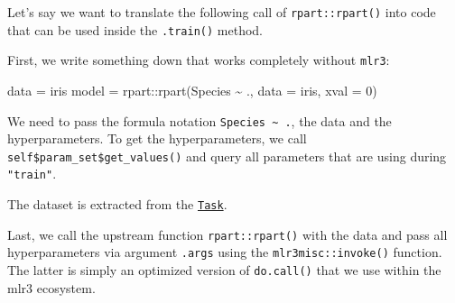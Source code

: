 \documentclass[
]{scrbook}
\newenvironment{Shaded}{\begin{snugshade}}{\end{snugshade}}
\newcommand{\AttributeTok}[1]{\textcolor[rgb]{0.77,0.63,0.00}{#1}}
\newcommand{\ControlFlowTok}[1]{\textcolor[rgb]{0.13,0.29,0.53}{\textbf{#1}}}
\newcommand{\DecValTok}[1]{\textcolor[rgb]{0.00,0.00,0.81}{#1}}
\newcommand{\FunctionTok}[1]{\textcolor[rgb]{0.00,0.00,0.00}{#1}}
\newcommand{\NormalTok}[1]{#1}
\newcommand{\OtherTok}[1]{\textcolor[rgb]{0.56,0.35,0.01}{#1}}
\newcommand{\SpecialCharTok}[1]{\textcolor[rgb]{0.00,0.00,0.00}{#1}}
\newcommand{\StringTok}[1]{\textcolor[rgb]{0.31,0.60,0.02}{#1}}
\renewenvironment{Shaded} {\begin{snugshade}\small} {\end{snugshade}}
\begin{document}
Let's say we want to translate the following call of \texttt{rpart::rpart()} into code that can be used inside the \texttt{.train()} method.

First, we write something down that works completely without \texttt{mlr3}:

\begin{Shaded}
\begin{Highlighting}[]
\NormalTok{data }\OtherTok{=}\NormalTok{ iris}
\NormalTok{model }\OtherTok{=}\NormalTok{ rpart}\SpecialCharTok{::}\FunctionTok{rpart}\NormalTok{(Species }\SpecialCharTok{\textasciitilde{}}\NormalTok{ ., }\AttributeTok{data =}\NormalTok{ iris, }\AttributeTok{xval =} \DecValTok{0}\NormalTok{)}
\end{Highlighting}
\end{Shaded}

We need to pass the formula notation \texttt{Species\ \textasciitilde{}\ .}, the data and the hyperparameters.
To get the hyperparameters, we call \texttt{self\$param\_set\$get\_values()} and query all parameters that are using during \texttt{"train"}.

The dataset is extracted from the \href{https://mlr3.mlr-org.com/reference/Task.html}{\texttt{Task}}.

Last, we call the upstream function \texttt{rpart::rpart()} with the data and pass all hyperparameters via argument \texttt{.args} using the \texttt{mlr3misc::invoke()} function.
The latter is simply an optimized version of \texttt{do.call()} that we use within the mlr3 ecosystem.

\begin{Shaded}
\end{Shaded}
\end{document}
